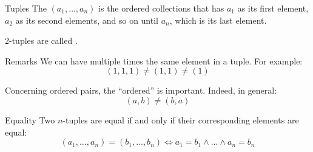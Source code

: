 \documentclass[a4paper]{article}
\begin{document}
\begin{parag}{Tuples}
    The  $\left(a_1, \ldots, a_n\right)$ is the ordered collections that has $a_1$ as its first element, $a_2$ as its second elements, and so on until $a_n$, which is its last element.

    2-tuples are called .

    \begin{subparag}{Remarks}
        We can have multiple times the same element in a tuple. For example:
        \[\left(1, 1, 1\right) \neq \left(1, 1\right) \neq \left(1\right)\]

        Concerning ordered pairs, the ``ordered'' is important. Indeed, in general:
        \[\left(a, b\right) \neq \left(b, a\right)\]
    \end{subparag}

    \begin{subparag}{Equality}
        Two $n$-tuples are equal if and only if their corresponding elements are equal:
        \[\left(a_1, \ldots, a_n\right) = \left(b_1, \ldots, b_n\right) \iff a_1 = b_1 \land \ldots \land a_n = b_n\]
    \end{subparag}
\end{parag}
\end{document}
